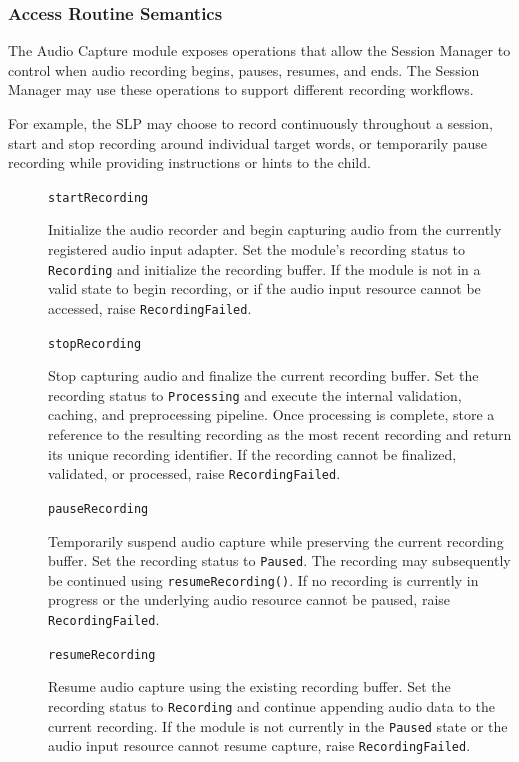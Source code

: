 \documentclass[12pt, titlepage]{article}
\begin{document}
\subsubsection{Access Routine Semantics}

The Audio Capture module exposes operations that allow the Session Manager to control when audio recording begins, pauses, resumes, and ends. The Session Manager may use these operations to support different recording workflows.

For example, the SLP may choose to record continuously throughout a session, start and stop recording around individual target words, or temporarily pause recording while providing instructions or hints to the child.

\begin{description}

\item[] \texttt{startRecording}\par
Initialize the audio recorder and begin capturing audio from the currently registered audio input adapter. Set the module's recording status to \texttt{Recording} and initialize the recording buffer. If the module is not in a valid state to begin recording, or if the audio input resource cannot be accessed, raise \texttt{RecordingFailed}.

\item[] \texttt{stopRecording}\par
Stop capturing audio and finalize the current recording buffer. Set the recording status to \texttt{Processing} and execute the internal validation, caching, and preprocessing pipeline. Once processing is complete, store a reference to the resulting recording as the most recent recording and return its unique recording identifier. If the recording cannot be finalized, validated, or processed, raise \texttt{RecordingFailed}.

\item[] \texttt{pauseRecording}\par
Temporarily suspend audio capture while preserving the current recording buffer. Set the recording status to \texttt{Paused}. The recording may subsequently be continued using \texttt{resumeRecording()}. If no recording is currently in progress or the underlying audio resource cannot be paused, raise \texttt{RecordingFailed}.

\item[] \texttt{resumeRecording}\par
Resume audio capture using the existing recording buffer. Set the recording status to \texttt{Recording} and continue appending audio data to the current recording. If the module is not currently in the \texttt{Paused} state or the audio input resource cannot resume capture, raise \texttt{RecordingFailed}.


\end{description}
\end{document}

